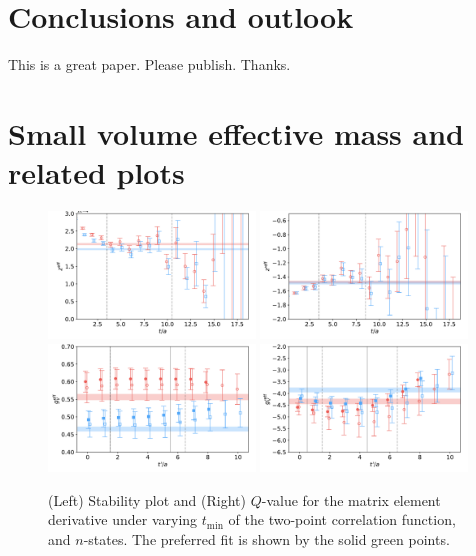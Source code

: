 \documentclass[prd,aps,twocolumn,superscriptaddress,tightenlines,nofootinbib,floatfix,preprintnumbers,10pt]{revtex4-1}
\begin{document}
\section{Conclusions and outlook}
This is a great paper. Please publish. Thanks.




\appendix

\clearpage
\newpage
\onecolumngrid

\section{Small volume effective mass and related plots}
\begin{figure}[h]{
\includegraphics[width=0.49\textwidth]{figures/3296_zeff.pdf}
\includegraphics[width=0.49\textwidth]{figures/3296_dzeff.pdf}
\includegraphics[width=0.49\textwidth]{figures/3296_gVeff.pdf}
\includegraphics[width=0.49\textwidth]{figures/3296_dgVeff.pdf}
\caption{(Left) Stability plot and (Right) $Q$-value for the matrix element derivative under varying $t_{\mathrm{min}}$ of the two-point correlation function, and $n$-states. The preferred fit is shown by the solid green points.}
\label{fig:effective}
}\end{figure}
\end{document}
